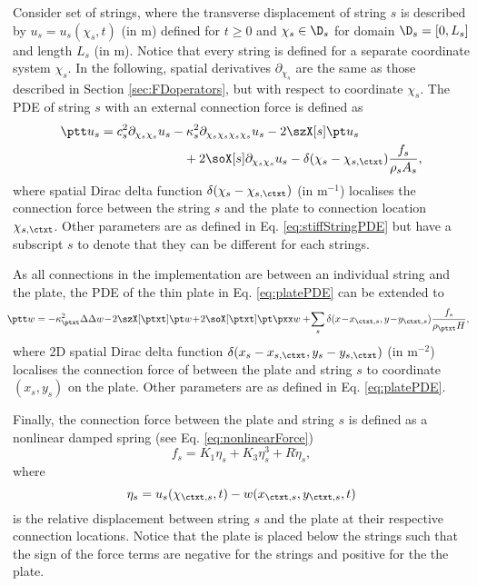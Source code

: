 Consider set of strings, where the transverse displacement of string $s$ is described by $u_s = u_s(\chi_s, t)$ (in m) defined for $t\geq 0$ and $\chi_s \in \D_s$ for domain $\D_s = [0, L_s]$ and length $L_s$ (in m). Notice that every string is defined for a separate coordinate system $\chi_s$. In the following, spatial derivatives $\partial_{\chi_s}$ are the same as those described in Section \ref{sec:FDoperators}, but with respect to coordinate $\chi_s$. The PDE of string $s$ with an external connection force is defined as %
\begin{equation}
    \begin{aligned}
    \ptt u_s = c_s^2 \partial_{\chi_s\chi_s} u_s &- \kappa_s^2 \partial_{\chi_s\chi_s\chi_s\chi_s} u_s - 2 \szX[s]\pt u_s\\
    &\quad + 2 \soX[s] \partial_{\chi_s\chi_s} u_s - \delta(\chi_s - \chi_{s, \ctxt})\frac{f_s}{\rho_sA_s},
    \end{aligned}
\end{equation}
where spatial Dirac delta function $\delta(\chi_s - \chi_{s,\ctxt})$ (in m$^{-1}$) localises the connection force between the string $s$ and the plate to connection location $\chi_{s, \ctxt}$. Other parameters are as defined in Eq. \eqref{eq:stiffStringPDE} but have a subscript $s$ to denote that they can be different for each strings. 

As all connections in the implementation are between an individual string and the plate, the PDE of the thin plate in Eq. \eqref{eq:platePDE} can be extended to 
\begin{equation}
    \begin{aligned}
    \!\!\!\!\ptt w = -\kappa_\ptxt^2\Delta\Delta w &\!-\! 2\szX[\ptxt]\pt w\! +\! 2\soX[\ptxt] \pt\pxx w+ \!\sum_s\delta(x \!-\! x_{\ctxt,s}, y \!-\! y_{\ctxt,s})\frac{f_s}{\rho_\ptxt H},\!\!\!\!\!\!
    \end{aligned}
\end{equation}
where 2D spatial Dirac delta function $\delta(x_s - x_{s,\ctxt}, y_s - y_{s,\ctxt})$ (in m$^{-2}$) localises the connection force of between the plate and string $s$ to coordinate $(x_s, y_s)$ on the plate. Other parameters are as defined in Eq. \eqref{eq:platePDE}. 

Finally, the connection force between the plate and string $s$ is defined as a nonlinear damped spring (see Eq. \ref{eq:nonlinearForce})
\begin{equation}
    f_s = K_1\eta_s + K_3\eta_s^3 + R \dot \eta_s,
\end{equation}
where
\begin{equation}
    \eta_s = u_s(\chi_{\ctxt,s}, t) - w(x_{\ctxt,s}, y_{\ctxt,s}, t)
\end{equation}
is the relative displacement between string $s$ and the plate at their respective connection locations. Notice that the plate is placed below the strings such that the sign of the force terms are negative for the strings and positive for the the plate.

